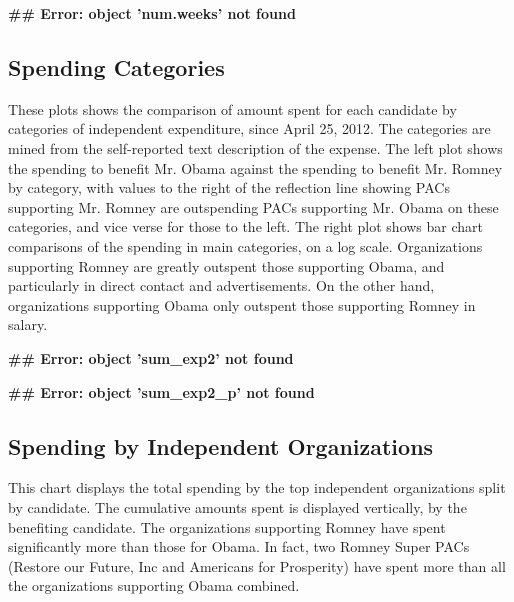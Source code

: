 \documentclass[11pt]{article}\usepackage{graphicx, color}
\makeatletter
\newenvironment{kframe}{%
 \def\at@end@of@kframe{}%
 \ifinner\ifhmode%
  \def\at@end@of@kframe{\end{minipage}}%
  \begin{minipage}{\columnwidth}%
 \fi\fi%
 \def\FrameCommand##1{\hskip\@totalleftmargin \hskip-\fboxsep
 \colorbox{shadecolor}{##1}\hskip-\fboxsep
     \hskip-\linewidth \hskip-\@totalleftmargin \hskip\columnwidth}%
 \MakeFramed {\advance\hsize-\width
   \@totalleftmargin\z@ \linewidth\hsize
   \@setminipage}}%
 {\par\unskip\endMakeFramed%
 \at@end@of@kframe}
\newenvironment{knitrout}{}{} %
\makeatother
\begin{document}
\begin{knitrout}
\color{fgcolor}\begin{kframe}


{\ttfamily\noindent\bfseries\textcolor{errorcolor}{\#\# Error: object 'num.weeks' not found}}\end{kframe}
\end{knitrout}



\subsection{Spending Categories}
These plots shows the comparison of amount spent for each candidate by categories of independent expenditure, since April 25, 2012. The categories are mined from the self-reported text description of the expense. The left plot shows the spending to benefit Mr. Obama against the spending to benefit Mr. Romney by category, with values to the right of the reflection line showing PACs supporting Mr. Romney are outspending PACs supporting Mr. Obama on these categories, and vice verse for those to the left. The right plot shows bar chart comparisons of the spending in main categories, on a log scale.
Organizations supporting Romney are greatly outspent those supporting Obama, and particularly in direct contact and advertisements. On the other hand, organizations supporting Obama only outspent those supporting Romney in salary. 

\begin{knitrout}
\color{fgcolor}\begin{kframe}


{\ttfamily\noindent\bfseries\textcolor{errorcolor}{\#\# Error: object 'sum\_exp2' not found}}

{\ttfamily\noindent\bfseries\textcolor{errorcolor}{\#\# Error: object 'sum\_exp2\_p' not found}}\end{kframe}
\end{knitrout}


\subsection{Spending by Independent Organizations}
This chart displays the total spending by the top independent organizations split by candidate. The cumulative amounts spent is displayed vertically, by the benefiting candidate. The organizations supporting Romney have spent significantly more than those for Obama. In fact, two Romney Super PACs (Restore our Future, Inc and Americans for Prosperity) have spent more than all the organizations supporting Obama combined.
\end{document}
